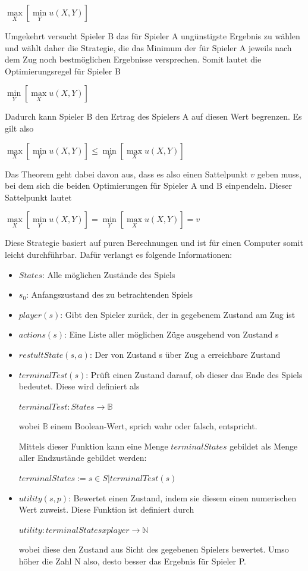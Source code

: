 $\max\limits_X[\min\limits_Yu(X,Y)]$

Umgekehrt versucht Spieler B das für Spieler A ungünstigste Ergebnis zu wählen und wählt daher die Strategie, die das Minimum der für Spieler A jeweils nach dem Zug noch bestmöglichen Ergebnisse versprechen. Somit lautet die Optimierungsregel für Spieler B

$\min\limits_Y[\max\limits_Xu(X,Y)]$


Dadurch kann Spieler B den Ertrag des Spielers A auf diesen Wert begrenzen. Es gilt also

$\max\limits_X[\min\limits_Yu(X,Y)] \leq \min\limits_Y[\max\limits_Xu(X,Y)]$

Das Theorem geht dabei davon aus, dass es also einen Sattelpunkt $v$ geben muss, bei dem sich die beiden Optimierungen für Spieler A und B einpendeln. Dieser Sattelpunkt lautet

$\max\limits_X[\min\limits_Yu(X,Y)] = \min\limits_Y[\max\limits_Xu(X,Y)] = v$

Diese Strategie basiert auf puren Berechnungen und ist für einen Computer somit leicht durchführbar. Dafür verlangt es folgende Informationen:

\begin{itemize}
\item \textbf{$States$}: Alle möglichen Zustände des Spiels
\item \textbf{$s_0$}: Anfangszustand des zu betrachtenden Spiels
\item \textbf{$player(s)$}: Gibt den Spieler zurück, der in gegebenem Zustand am Zug ist
\item \textbf{$actions(s)$}: Eine Liste aller möglichen Züge ausgehend von Zustand s
\item \textbf{$restultState(s,a)$}: Der von Zustand s über Zug a erreichbare Zustand
\item \textbf{$terminalTest(s)$}:  Prüft einen Zustand darauf, ob dieser das Ende des Spiels bedeutet. Diese wird definiert als

$terminalTest : States \rightarrow \mathbb{B}$

wobei $\mathbb{B}$ einem Boolean-Wert, sprich wahr oder falsch, entspricht.

Mittels dieser Funktion kann eine Menge $terminalStates$ gebildet als Menge aller Endzustände gebildet werden:

$terminalStates := {s \in S | terminalTest(s)}$
\item \textbf{$utility(s, p)$}: Bewertet einen Zustand, indem sie diesem einen numerischen Wert zuweist. Diese Funktion ist definiert durch

$utility : terminalStates x player \rightarrow \mathbb{N}$

wobei diese den Zustand aus Sicht des gegebenen Spielers bewertet. Umso höher die Zahl N also, desto besser das Ergebnis für Spieler P.
\end{itemize}

